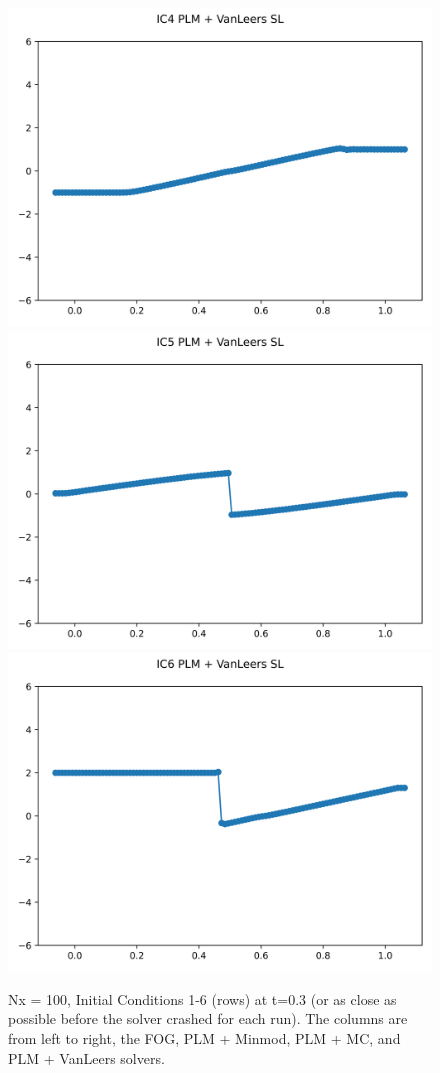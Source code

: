 \documentclass{article}
\begin{document}
\begin{figure}[t]
        \includegraphics[width=.95\textwidth]{../../code/hires_IC4Methodpv_plot.png}
        \includegraphics[width=.95\textwidth]{../../code/hires_IC5Methodpv_plot.png}
        \includegraphics[width=.95\textwidth]{../../code/hires_IC6Methodpv_plot.png}
    \emp
    \caption{Nx = 100, Initial Conditions 1-6 (rows) at t=0.3 (or as close as possible before the
    solver crashed for each run). The columns are from left to right, the FOG,
    PLM + Minmod, PLM + MC, and PLM + VanLeers solvers.}
    \label{fig:hires_sol_1_6}
\end{figure}
\end{document}
